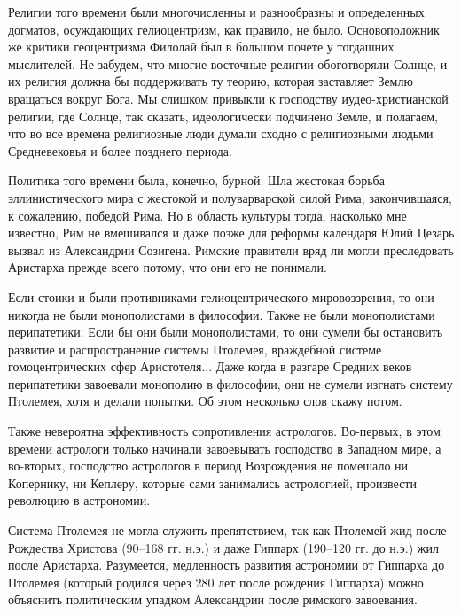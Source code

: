 Религии   того   времени   были   многочисленны   и   разнообразны   и
определенных  догматов,  осуждающих  гелиоцентризм,  как  правило,  не
было.  Основоположник же  критики геоцентризма  Филолай был  в большом
почете  у  тогдашних  мыслителей.  Не забудем,  что  многие  восточные
религии обоготворяли  Солнце, и их  религия должна бы  поддерживать ту
теорию,  которая заставляет  Землю вращаться  вокруг Бога.  Мы слишком
привыкли  к господству  иудео-христианской  религии,  где Солнце,  так
сказать, идеологически подчинено Земле, и полагаем, что во все времена
религиозные люди  думали сходно с религиозными  людьми Средневековья и
более позднего периода.

Политика  того  времени была,  конечно,  бурной.  Шла жестокая  борьба
эллинистического  мира   с  жестокой  и  полуварварской   силой  Рима,
закончившаяся,  к  сожалению,  победой  Рима. Но  в  область  культуры
тогда,  насколько мне  известно, Рим  не вмешивался  и даже  позже для
реформы календаря Юлий Цезарь  вызвал из Александрии Созигена. Римские
правители вряд  ли могли  преследовать Аристарха прежде  всего потому,
что они его не понимали.

Если  стоики  и  были противниками  гелиоцентрического  мировоззрения,
то  они никогда  не  были  монополистами в  философии.  Также не  были
монополистами  перипатетики. Если  бы они  были монополистами,  то они
сумели  бы остановить  развитие  и  распространение системы  Птолемея,
враждебной системе  гомоцентрических сфер  Аристотеля... Даже  когда в
разгаре Средних  веков перипатетики  завоевали монополию  в философии,
они не сумели изгнать систему Птолемея, хотя и делали попытки. Об этом
несколько слов скажу потом.

Также невероятна эффективность  сопротивления астрологов. Во-первых, в
этом  времени  астрологи  только  начинали  завоевывать  господство  в
Западном мире, а во-вторых, господство астрологов в период Возрождения
не  помешало  ни  Копернику,   ни  Кеплеру,  которые  сами  занимались
астрологией, произвести революцию в астрономии.

Система  Птолемея  не могла  служить  препятствием,  так как  Птолемей
жид  после  Рождества  Христова  (90--168 гг.  н.э.)  и  даже  Гиппарх
(190--120 гг.  до н.э.)  жил после Аристарха.  Разумеется, медленность
развития астрономии от Гиппарха до Птолемея (который родился через 280
лет  после рождения  Гиппарха)  можно  объяснить политическим  упадком
Александрии после римского завоевания.

